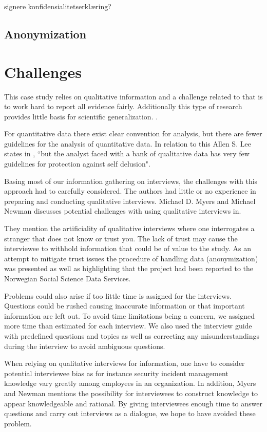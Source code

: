 signere konfidensialitetserklæring?


\subsection{Anonymization}
\section{Challenges}
This case study relies on qualitative information and a challenge related to that is to work hard to report all evidence fairly. Additionally this type of research provides little basis for scientific generalization. \cite{CaseStudyResearch}.

For quantitative data there exist clear convention for analysis, but there are fewer guidelines for the analysis of quantitative data. In relation to this Allen S. Lee states in \cite{lee1989scientific}, ``but the analyst faced with a bank of qualitative data has very few guidelines for protection against self delusion".

Basing most of our information gathering on interviews, the challenges with this approach had to carefully considered. The authors had little or no experience in preparing and conducting qualitative interviews. Michael D. Myers and Michael Newman discusses potential challenges with using qualitative interviews in\cite{myers2007qualitative}. 

They mention the artificiality of qualitative interviews where one interrogates a stranger that does not know or trust you. The lack of trust may cause the interviewee to withhold information that could be of value to the study. As an attempt to mitigate trust issues the procedure of handling data (anonymization) was presented as well as highlighting that the project had been reported to the Norwegian Social Science Data Services.   

Problems could also arise if too little time is assigned for the interviews. Questions could be rushed causing inaccurate information or that important information are left out. To avoid time limitations being a concern, we assigned more time than estimated for each interview. We also used the interview guide with predefined questions and topics as well as correcting any misunderstandings during the interview to avoid ambiguous questions.

When relying on qualitative interviews for information, one have to consider potential interviewee bias as for instance security incident management knowledge vary greatly among employees in an organization. In addition, Myers and Newman mentions the possibility for interviewees to construct knowledge to appear knowledgeable and rational. By giving interviewees enough time to answer questions and carry out interviews as a dialogue, we hope to have avoided these problem.




